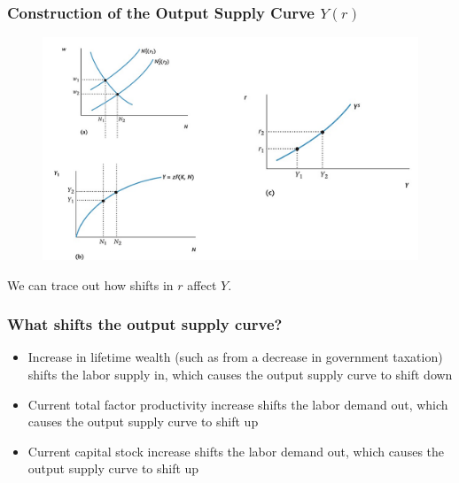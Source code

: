 \documentclass{beamer}
\begin{document}
\begin{frame}
\frametitle[alignment=center]{Construction of the Output Supply Curve $Y(r)$} 
\begin{figure}
\centering
\includegraphics[scale=0.6]{Figures/W_Fig_11pt15.png}
\end{figure}
We can trace out how shifts in $r$ affect $Y$.  
\end{frame}

\begin{frame}
\frametitle[alignment=center]{What shifts the output supply curve?}
\begin{itemize}
\item Increase in lifetime wealth (such as from a decrease in government taxation) shifts the labor supply in, which causes the output supply curve to shift down
\bigskip
\item Current total factor productivity increase shifts the labor demand out, which causes the output supply curve to shift up 
\bigskip
\item Current capital stock increase shifts the labor demand out, which causes the output supply curve to shift up 
\end{itemize} 
\end{frame}
\end{document}
